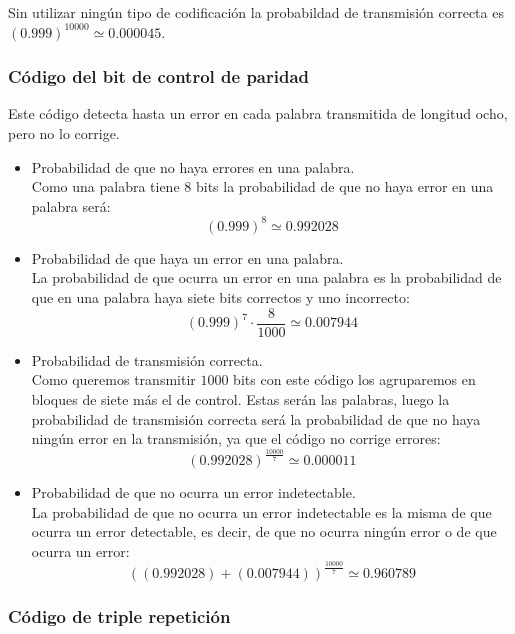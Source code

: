 Sin utilizar ning\'un tipo de codificaci\'on la probabildad de transmisi\'on
correcta es $(0.999)^{10000}\simeq0.000045$.
%
\newpage
%
\subsubsection{C\'odigo del bit de control de paridad}

Este c\'odigo detecta hasta un error en cada palabra transmitida de longitud
ocho, pero no lo corrige.
\begin{itemize}
\item Probabilidad de que no haya errores en una palabra.\\

Como una palabra tiene $8$ bits la probabilidad de que no haya error en una
palabra ser\'a:
$$(0.999)^8\simeq 0.992028$$
\item Probabilidad de que haya un error en una palabra.\\

La probabilidad de que ocurra un error en una palabra es la probabilidad de
que en una palabra haya siete bits correctos y uno incorrecto:
$$(0.999)^7\cdot \frac{8}{1000}\simeq 0.007944$$
\item Probabilidad de transmisi\'on correcta.\\

Como queremos transmitir $1000$ bits con este c\'odigo los agruparemos en
bloques de siete m\'as el de control. Estas ser\'an las palabras, luego la
probabilidad de transmisi\'on correcta ser\'a la probabilidad de que no haya
ning\'un error en la transmisi\'on, ya que el c\'odigo no corrige errores:
$$(0.992028)^{\frac{10000}{7}}\simeq 0.000011$$
\item Probabilidad de que no ocurra un error indetectable.\\

La probabilidad de que no ocurra un error indetectable es la misma de que ocurra
un error detectable, es decir, de que no ocurra ning\'un error o de que ocurra
un error:
\begin{displaymath}
((0.992028)+(0.007944))^{\frac{10000}{7}}\simeq 0.960789
\end{displaymath}
\end{itemize}
%
\newpage
%
\subsubsection{C\'odigo de triple repetici\'on}

